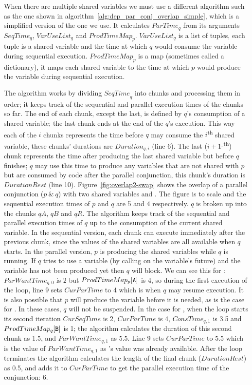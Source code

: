 When there are multiple shared variables we must use a different algorithm
such as the one shown in algorithm~\ref{alg:dep_par_conj_overlap_simple},
which is a simplified version of the one we use.
It calculates $ParTime_q$ from its arguments $SeqTime_q$, $VarUseList_q$ and
$ProdTimeMap_p$.
$VarUseList_q$ is a list of tuples,
each tuple is a shared variable and the time at which $q$ would consume the
variable during sequential execution.
$ProdTimeMap_p$ is a map (sometimes called a dictionary),
it maps each shared variable to the time at which $p$ would produce the
variable during sequential execution.


The algorithm works by dividing ${SeqTime}_q$ into chunks
and processing them in order;
it keeps track of the sequential and parallel execution times of the
chunks so far.
The end of each chunk, except the last, is defined by $q$'s consumption of a
shared variable;
the last chunk ends at the end of the $q$'s execution.
This way each of the $i$ chunks represents the time before $q$ may consume the
$i$\textsuperscript{th} shared variable,
these chunks' durations are $Duration_{q, i}$ (line 6).
The last ($i+1$-\textsuperscript{th}) chunk represents the time after
producing the last shared variable but before $q$ finishes; 
$q$ may use this time to produce any variables that are not shared with $p$
but are consumed by code after the parallel conjunction,
this chunk's duration is $DurationRest$ (line 10).
Figure~\ref{fig:overlap2-swap} shows the overlap of a parallel conjunction 
($p~\&~q$) with two shared variables  and .
The figure is to scale and the sequential execution times of $p$ and $q$ are
5 and 4 respectively.
$q$ is broken up into the chunks $qA$, $qB$ and $qR$.
The algorithm keeps track of the sequential and parallel execution times of $q$
up to the consumption of the current shared variable.
In the sequential version,
each chunk can execute immediately after the previous chunk,
since the values of the shared variables are all available when $q$ starts.
In the parallel version,
$p$ is producing the shared variables while $q$ is running.
If $q$ tries to use a variable (by calling \wait on the variable's future)
and the variable has not been produced yet then $q$ will block.
We can see this for :
$ParWantTime_{q, 0}$ is 2 but $ProdTimeMap_p[\text{{\tt A}}]$ is 4,
so during the first execution of the loop,
line 9 sets $CurParTime$ to 4 which is when $q$ may resume execution.
It is also possible that $p$ will produce the variable before it is
needed, as is the case for .
In these cases, $q$ will not be suspended.
In the case for ,
when the loop starts its second iteration $CurSeqTime$ is 2,
$CurParTime$ is 4, $ConsTime_{q, 1}$ is 3.5 and
$ProdTimeMap_q[\text{{\tt B}}]$ is 1;
the algorithm calculates the duration of this second chunk as 1.5,
and $ParWantTime_{q, 1}$ as 5.5.
Line 9 sets $CurParTime$ to 5.5 which is the value of $ParWantTime_{q, 1}$
as 's value was already available.
After the loop terminates the algorithm calculates the length of the final
chunk ($DurationRest$) as 0.5,
and adds it to $CurParTime$ to get the parallel execution time of the
conjunction: 6.

